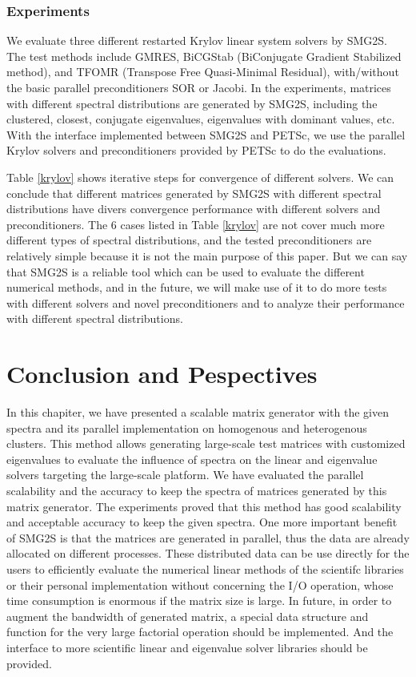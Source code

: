 \subsubsection{Experiments}

We evaluate three different restarted Krylov linear system solvers by SMG2S. The test methods include GMRES, BiCGStab (BiConjugate Gradient Stabilized method), and TFOMR (Transpose Free Quasi-Minimal Residual), with/without the basic parallel preconditioners SOR or Jacobi. In the experiments, matrices with different spectral distributions are generated by SMG2S, including the clustered, closest, conjugate eigenvalues, eigenvalues with dominant values, etc. With the interface implemented between SMG2S and PETSc, we use the parallel Krylov solvers and preconditioners provided by PETSc to do the evaluations.

Table \ref{krylov} shows iterative steps for convergence of different solvers. We can conclude that different matrices generated by SMG2S with different spectral distributions have divers convergence performance with different solvers and preconditioners. The 6 cases listed in Table \ref{krylov} are not cover much more different types of spectral distributions, and the tested preconditioners are relatively simple because it is not the main purpose of this paper. But we can say that SMG2S is a reliable tool which can be used to evaluate the different numerical methods, and in the future, we will make use of it to do more tests with different solvers and novel preconditioners and to analyze their performance with different spectral distributions.

\section{Conclusion and Pespectives}\label{conclusion}

In this chapiter, we have presented a scalable matrix generator with the given spectra and its parallel implementation on homogenous and heterogenous clusters. This method allows generating large-scale test matrices with customized eigenvalues to evaluate the influence of spectra on the linear and eigenvalue solvers targeting the large-scale platform. We have evaluated the parallel scalability and the accuracy to keep the spectra of matrices generated by this matrix generator. The experiments proved that this method has good scalability and acceptable accuracy to keep the given spectra. One more important benefit of SMG2S is that the matrices are generated in parallel, thus the data are already allocated on different processes. These distributed data can be use directly for the users to efficiently evaluate the numerical linear methods of the scientifc libraries or their personal implementation without concerning the I/O operation, whose time consumption is enormous if the matrix size is large. In future, in order to augment the bandwidth of generated matrix, a special data structure and function for the very large factorial operation should be implemented. And the interface to more scientific linear and eigenvalue solver libraries should be provided.


\clearemptydoublepage
